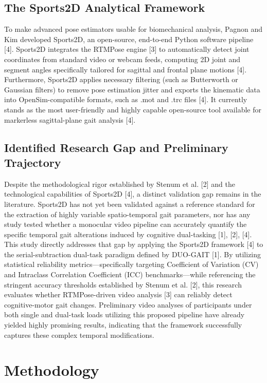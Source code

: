 \documentclass[conference]{IEEEtran}
\begin{document}
\subsection{The Sports2D Analytical Framework}
To make advanced pose estimators usable for biomechanical analysis, Pagnon and Kim developed Sports2D, an open-source, end-to-end Python software pipeline [4]. Sports2D integrates the RTMPose engine [3] to automatically detect joint coordinates from standard video or webcam feeds, computing 2D joint and segment angles specifically tailored for sagittal and frontal plane motions [4]. Furthermore, Sports2D applies necessary filtering (such as Butterworth or Gaussian filters) to remove pose estimation jitter and exports the kinematic data into OpenSim-compatible formats, such as .mot and .trc files [4]. It currently stands as the most user-friendly and highly capable open-source tool available for markerless sagittal-plane gait analysis [4].

\subsection{Identified Research Gap and Preliminary Trajectory}
Despite the methodological rigor established by Stenum et al. [2] and the technological capabilities of Sports2D [4], a distinct validation gap remains in the literature. Sports2D has not yet been validated against a reference standard for the extraction of highly variable spatio-temporal gait parameters, nor has any study tested whether a monocular video pipeline can accurately quantify the specific temporal gait alterations induced by cognitive dual-tasking [1], [2], [4]. This study directly addresses that gap by applying the Sports2D framework [4] to the serial-subtraction dual-task paradigm defined by DUO-GAIT [1]. By utilizing statistical reliability metrics—specifically targeting Coefficient of Variation (CV) and Intraclass Correlation Coefficient (ICC) benchmarks—while referencing the stringent accuracy thresholds established by Stenum et al. [2], this research evaluates whether RTMPose-driven video analysis [3] can reliably detect cognitive-motor gait changes. Preliminary video analyses of participants under both single and dual-task loads utilizing this proposed pipeline have already yielded highly promising results, indicating that the framework successfully captures these complex temporal modifications.

\section{Methodology}
\end{document}
